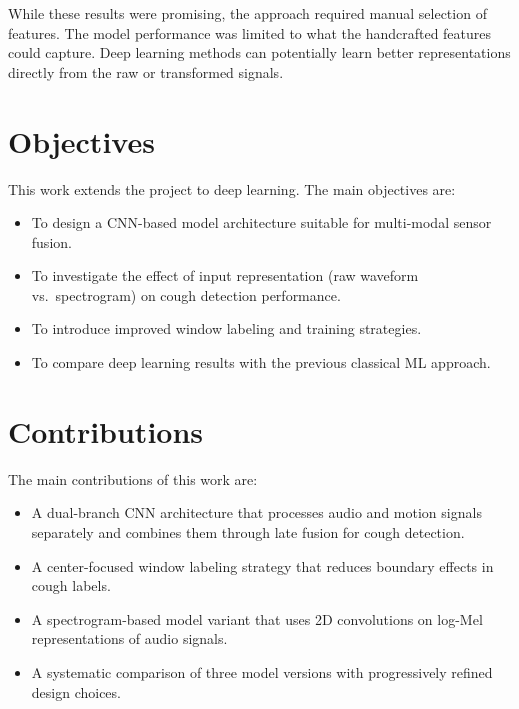 While these results were promising, the approach required manual selection of features. The model performance was limited to what the handcrafted features could capture. Deep learning methods can potentially learn better representations directly from the raw or transformed signals.

\section{Objectives}

This work extends the project to deep learning. The main objectives are:
\begin{itemize}[nosep]
    \item To design a CNN-based model architecture suitable for multi-modal sensor fusion.
    \item To investigate the effect of input representation (raw waveform vs.\ spectrogram) on cough detection performance.
    \item To introduce improved window labeling and training strategies.
    \item To compare deep learning results with the previous classical ML approach.
\end{itemize}

\section{Contributions}

The main contributions of this work are:
\begin{itemize}[nosep]
    \item A dual-branch CNN architecture that processes audio and motion signals separately and combines them through late fusion for cough detection.
    \item A center-focused window labeling strategy that reduces boundary effects in cough labels.
    \item A spectrogram-based model variant that uses 2D convolutions on log-Mel representations of audio signals.
    \item A systematic comparison of three model versions with progressively refined design choices.
\end{itemize}
